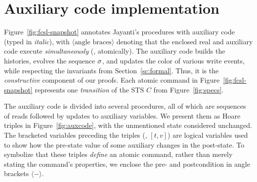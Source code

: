 
\section{Auxiliary code implementation}
\label{sc:implementation}


Figure~\ref{fig:fcsl-snapshot} annotates Jayanti's procedures with
auxiliary code (typed in \emph{italic}), with $\langle\mbox{angle
braces}\rangle$ denoting that the enclosed real and auxiliary code
execute \emph{simultaneously} (\ie, atomically). The auxiliary code
builds the histories, evolves the sequence $\sigma$, and updates the
color of various write events, while respecting the invariants from
Section~\ref{sc:formal}. Thus, it is the \emph{constructive} component
of our proofs. Each atomic command in Figure~\ref{fig:fcsl-snapshot}
represents one \emph{transition} of the STS $C$ from
Figure~\ref{fig:specs}.

%
%
%

The auxiliary code is divided into several procedures, all of which
are sequences of reads followed by updates to auxiliary variables. We
present them as Hoare triples in Figure~\ref{fig:auxcode}, with the
unmentioned state considered unchanged. The bracketed variables
preceding the triples (\eg, $[t, v]$) are logical variables used to
show how the pre-state value of some auxiliary changes in the
post-state. To symbolize that these triples \emph{define} an atomic
command, rather than merely stating the command's properties, we
enclose the pre- and postcondition in angle brackets $\langle
- \rangle$.


% 




%

